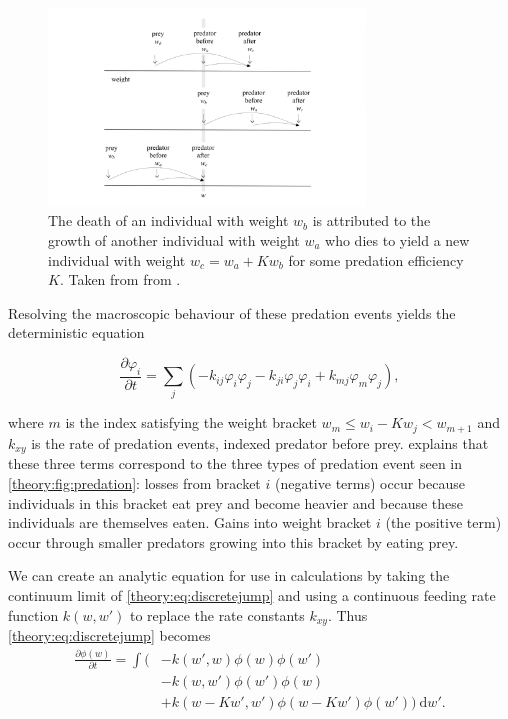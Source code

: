 \documentclass[../main.tex]{subfiles}
\begin{document}
  \begin{figure}[ht]
    \centering
    \caption{The death of an individual with weight $w_b$ is attributed to the growth of another individual with weight $w_a$ who dies to yield a new individual with weight $w_c = w_a + K w_b$ for some predation efficiency $K$. Taken from from \cite{datta2010}. \label{theory:fig:predation}}
    \includegraphics[width=0.75\textwidth]{_assets/stochastic_predation.png}
  \end{figure}

  Resolving the macroscopic behaviour of these predation events yields the deterministic equation

  \begin{equation}\label{theory:eq:discretejump}
    \frac{\partial \varphi_i}{\partial t} = \sum_j \left(- k_{ij} \varphi_i \varphi_j - k_{ji} \varphi_j \varphi_i + k_{mj} \varphi_m \varphi_j \right),
  \end{equation}

  where $m$ is the index satisfying the weight bracket $w_m \leq w_i - K w_j < w_{m+1}$ and $k_{xy}$ is the rate of predation events, indexed predator before prey. \cite{datta2010} explains that these three terms correspond to the three types of predation event seen in \autoref{theory:fig:predation}: losses from bracket $i$ (negative terms) occur because individuals in this bracket eat prey and become heavier and because these individuals are themselves eaten. Gains into weight bracket $i$ (the positive term) occur through smaller predators growing into this bracket by eating prey.

  We can create an analytic equation for use in calculations by taking the continuum limit of \autoref{theory:eq:discretejump} and using a continuous feeding rate function $k(w, w')$ to replace the rate constants $k_{xy}$. Thus \autoref{theory:eq:discretejump} becomes
  \begin{align}\label{theory:eq:jumpgrowth}
    \frac{\partial \phi(w)}{\partial t}
    = \int ( &- k(w', w) \phi(w)\phi(w') \nonumber \\
    & - k(w, w')\phi(w')\phi(w) \nonumber \\
    & + k(w - Kw', w')\phi(w - Kw')\phi(w')) \: \mathrm{d}w'.
  \end{align}
\end{document}
